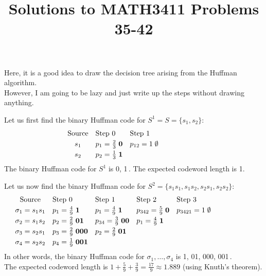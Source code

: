 \documentclass[11pt]{article}
\date{}
\author{}
\title{\sc Solutions to MATH3411 Problems 35-42}
\begin{document}
 \maketitle

\vspace*{-10mm}

Here, it is a good idea to draw the decision tree arising from the Huffman algorithm.\\
However, I am going to be lazy and just write up the steps without drawing anything.

Let us first find the binary Huffman code for $S^1 = S = \{s_1,s_2\}$:
\[\hspace*{-20mm}\begin{array}{cll}
  \text{Source} & \text{Step 0}                 & \text{Step 1}\\[1mm]
    s_1         & p_1 = \frac{2}{3}\;\mathbf{0} & p_{12} = 1\;\mathbf{\emptyset}\\[1mm]
    s_2         & p_2 = \frac{1}{3}\;\mathbf{1}
  \end{array}\]
The binary Huffman code for $S^1$ is 0, 1\,.
The expected codeword length is 1.

Let us now find the binary Huffman code for $S^2 = \{s_1s_1,s_1s_2,s_2s_1,s_2s_2\}$:
\[\hspace*{-20mm}\begin{array}{cllll}
  \text{Source}       & \text{Step 0}                   & \text{Step 1}                     & \text{Step 2}                     & \text{Step 3}\\[1mm]
    \sigma_1 = s_1s_1 & p_1 = \frac{4}{9}\;\mathbf{  1} & p_1    = \frac{4}{9}\;\mathbf{ 1} & p_{342} = \frac{5}{9}\;\mathbf{0} & p_{3421} = 1\;\mathbf{\emptyset}\\[1mm]
    \sigma_2 = s_1s_2 & p_2 = \frac{2}{9}\;\mathbf{ 01} & p_{34} = \frac{3}{9}\;\mathbf{00} & p_1     = \frac{4}{9}\;\mathbf{1}\\[1mm]
    \sigma_3 = s_2s_1 & p_3 = \frac{2}{9}\;\mathbf{000} & p_2    = \frac{2}{9}\;\mathbf{01}\\[1mm]
    \sigma_4 = s_2s_2 & p_4 = \frac{1}{9}\;\mathbf{001}
\end{array}\]
In other words, the binary Huffman code for $\sigma_1,\dots,\sigma_4$ is 1, 01, 000, 001\,.
\\The expected codeword length is $1 + \frac{5}{9} + \frac{3}{9} = \frac{17}{9} \approx 1.889$ (using Knuth's theorem).
\end{document}
